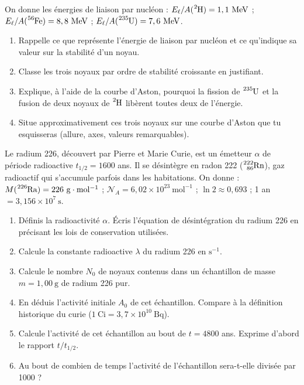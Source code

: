 \documentclass[11pt]{article}
\newcounter{popsec}
\newcounter{popsub}
\newcommand{\courssub}[1]{%
  \stepcounter{popsub}%
  \par\vspace{9pt}\noindent{\popxbold\fontsize{11.5}{13}\selectfont\color{popink}{\color{poporange}\thepopsec.\thepopsub}\hspace{6pt}#1}\par\nopagebreak\vspace{4pt}
}
\begin{document}
\begin{exercice}
On donne les énergies de liaison par nucléon : $E_\ell/A(\ce{^{2}H}) = 1,1\ \mathrm{MeV}$ ; $E_\ell/A(\ce{^{56}Fe}) = 8,8\ \mathrm{MeV}$ ; $E_\ell/A(\ce{^{235}U}) = 7,6\ \mathrm{MeV}$.
\begin{enumerate}
\item Rappelle ce que représente l'énergie de liaison par nucléon et ce qu'indique sa valeur sur la stabilité d'un noyau.
\item Classe les trois noyaux par ordre de stabilité croissante en justifiant.
\item Explique, à l'aide de la courbe d'Aston, pourquoi la fission de $\ce{^{235}U}$ et la fusion de deux noyaux de $\ce{^{2}H}$ libèrent toutes deux de l'énergie.
\item Situe approximativement ces trois noyaux sur une courbe d'Aston que tu esquisseras (allure, axes, valeurs remarquables).
\end{enumerate}
\end{exercice}

\courssub{Je me prépare au Bac}

\begin{exercice}
Le radium 226, découvert par Pierre et Marie Curie, est un émetteur $\alpha$ de période radioactive $t_{1/2} = 1600$ ans. Il se désintègre en radon 222 ($\ce{^{222}_{86}Rn}$), gaz radioactif qui s'accumule parfois dans les habitations.
On donne : $M(\ce{^{226}Ra}) = 226\ \mathrm{g\cdot mol^{-1}}$ ; $\mathcal{N}_A = 6,02\times 10^{23}\ \mathrm{mol^{-1}}$ ; $\ln 2 \approx 0,693$ ; 1 an $= 3,156\times 10^{7}\ \mathrm{s}$.
\begin{enumerate}
\item Définis la radioactivité $\alpha$. Écris l'équation de désintégration du radium 226 en précisant les lois de conservation utilisées.
\item Calcule la constante radioactive $\lambda$ du radium 226 en $\mathrm{s^{-1}}$.
\item Calcule le nombre $N_0$ de noyaux contenus dans un échantillon de masse $m = 1,00\ \mathrm{g}$ de radium 226 pur.
\item En déduis l'activité initiale $A_0$ de cet échantillon. Compare à la définition historique du curie ($1\ \mathrm{Ci} = 3,7\times 10^{10}\ \mathrm{Bq}$).
\item Calcule l'activité de cet échantillon au bout de $t = 4800$ ans. Exprime d'abord le rapport $t/t_{1/2}$.
\item Au bout de combien de temps l'activité de l'échantillon sera-t-elle divisée par 1000 ?
\end{enumerate}
\end{exercice}
\end{document}
